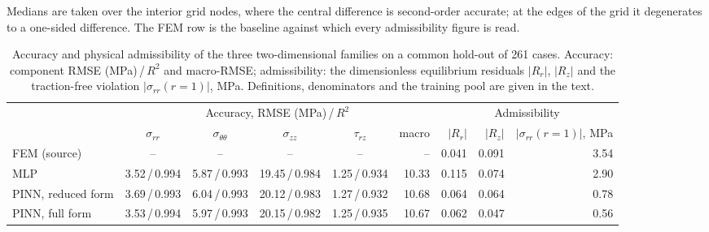 \documentclass[subscriptcorrection,upint,varvw,barcolor=Goldenrod3,mathalfa=cal=euler,balance,hyphenate,french,pdf-a]{asmejour} %
\begin{document}
Medians are taken over the interior grid nodes, where the central difference is second-order accurate; at the edges of the grid it degenerates to a one-sided difference. %
The FEM row is the baseline against which every admissibility figure is read. %
\begin{table}[t]
\caption{Accuracy and physical admissibility of the three two-dimensional families on a common hold-out of 261 cases. Accuracy: component RMSE (MPa)\,/\,$R^2$ and macro-RMSE; admissibility: the dimensionless equilibrium residuals $|R_r|$, $|R_z|$ and the traction-free violation $|\sigma_{rr}(r{=}1)|$, MPa. Definitions, denominators and the training pool are given in the text.}
\label{tab:admissibility}
\centering\small
\setlength{\tabcolsep}{4pt}
\begin{tabular}{@{}lccccrrrr@{}}
\toprule
 & \multicolumn{5}{c}{Accuracy, RMSE (MPa)\,/\,$R^2$} & \multicolumn{3}{c}{Admissibility} \\
\cmidrule(lr){2-6}\cmidrule(lr){7-9}
 & $\sigma_{rr}$ & $\sigma_{\theta\theta}$ & $\sigma_{zz}$ & $\tau_{rz}$ & macro & $|R_r|$ & $|R_z|$ & $|\sigma_{rr}(r{=}1)|$, MPa \\
\midrule
FEM (source)       & --           & --           & --            & --           & --    & 0.041 & 0.091 & 3.54 \\
MLP                & 3.52\,/\,0.994 & 5.87\,/\,0.993 & 19.45\,/\,0.984 & 1.25\,/\,0.934 & 10.33 & 0.115 & 0.074 & 2.90 \\
PINN, reduced form & 3.69\,/\,0.993 & 6.04\,/\,0.993 & 20.12\,/\,0.983 & 1.27\,/\,0.932 & 10.68 & 0.064 & 0.064 & 0.78 \\
PINN, full form    & 3.53\,/\,0.994 & 5.97\,/\,0.993 & 20.15\,/\,0.982 & 1.25\,/\,0.935 & 10.67 & 0.062 & 0.047 & 0.56 \\
\bottomrule
\end{tabular}
\end{table}
\end{document}
